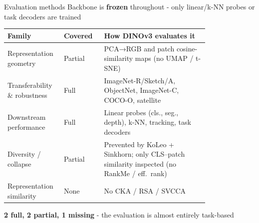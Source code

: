 \begin{frame}{Evaluation methods}
    Backbone is \textbf{frozen} throughout - only linear/k-NN probes or task decoders are trained
    \vspace{5px}
    \begin{table}
        \centering
        \footnotesize
        \begin{tabular}{>{\raggedright\arraybackslash}p{0.28\linewidth} l >{\raggedright\arraybackslash}p{0.52\linewidth}}
            \toprule[1.5pt]
            \textbf{Family} & \textbf{Covered} & \textbf{How DINOv3 evaluates it} \\
            \midrule[1.5pt]
            Representation geometry & Partial & PCA→RGB and patch cosine-similarity maps (no UMAP / t-SNE) \\
            \midrule
            Transferability \& robustness & Full & ImageNet-R/Sketch/A, ObjectNet, ImageNet-C, COCO-O, satellite \\ 
            \midrule
            Downstream performance & 
            Full & Linear probes (cls., seg., depth), k-NN, tracking, task decoders \\ 
            \midrule
            Diversity / collapse & Partial & Prevented by KoLeo + Sinkhorn; only CLS--patch similarity inspected (no RankMe / eff.\ rank) \\
            \midrule
            Representation similarity & None & No CKA / RSA / SVCCA \\
            \bottomrule[1.5pt]
        \end{tabular}
    \end{table}
    \vspace{5px}
    \textbf{2 full, 2 partial, 1 missing} - the evaluation is almost entirely task-based
\end{frame}
